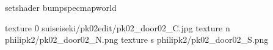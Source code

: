 setshader bumpspecmapworld

texture 0 suiseiseki/pk02edit/pk02_door02_C.jpg
texture n philipk2/pk02_door02_N.png
texture s philipk2/pk02_door02_S.png

